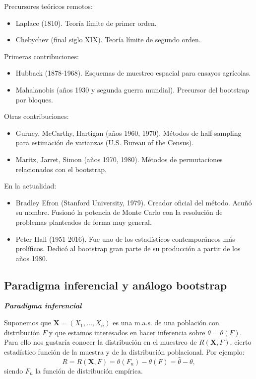 \documentclass[]{book}
\theoremstyle{definition}
\theoremstyle{definition}
\theoremstyle{definition}
\theoremstyle{remark}
\begin{document}
Precursores teóricos remotos:

\begin{itemize}
\item
  Laplace (1810). Teoría límite de primer orden.
\item
  Chebychev (final siglo XIX). Teoría límite de segundo orden.
\end{itemize}

Primeras contribuciones:

\begin{itemize}
\item
  Hubback (1878-1968). Esquemas de muestreo espacial para ensayos
  agrícolas.
\item
  Mahalanobis (años 1930 y segunda guerra mundial). Precursor del
  bootstrap por bloques.
\end{itemize}

Otras contribuciones:

\begin{itemize}
\item
  Gurney, McCarthy, Hartigan (años 1960, 1970). Métodos de half-sampling
  para estimación de varianzas (U.S. Bureau of the Census).
\item
  Maritz, Jarret, Simon (años 1970, 1980). Métodos de permutaciones
  relacionados con el bootstrap.
\end{itemize}

En la actualidad:

\begin{itemize}
\item
  Bradley Efron (Stanford University, 1979). Creador oficial del método.
  Acuñó su nombre. Fusionó la potencia de Monte Carlo con la resolución
  de problemas planteados de forma muy general.
\item
  Peter Hall (1951-2016). Fue uno de los estadísticos contemporáneos más
  prolíficos. Dedicó al bootstrap gran parte de su producción a partir
  de los años 1980.
\end{itemize}

\subsection{Paradigma inferencial y análogo
bootstrap}\label{paradigma-inferencial-y-analogo-bootstrap}

\textbf{\emph{Paradigma inferencial}}

Suponemos que \(\mathbf{X}=\left( X_1,\ldots ,X_n \right)\) es una
m.a.s. de una población con distribución \(F\) y que estamos interesados
en hacer inferencia sobre \(\theta =\theta \left(F \right)\). Para ello
nos gustaría conocer la distribución en el muestreo de
\(R\left( \mathbf{X},F \right)\), cierto estadístico función de la
muestra y de la distribución poblacional. Por ejemplo:
\[R=R\left( \mathbf{X},F \right) =\theta \left( F_n \right) 
-\theta \left( F \right) = \hat \theta - \theta,\] siendo \(F_n\) la
función de distribución empírica.
\end{document}
